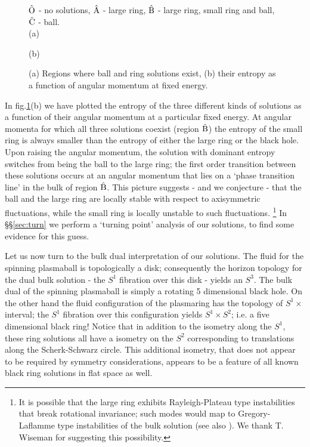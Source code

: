 \begin{figure}
%
 \begin{center}
  \small{$\hat{\mathrm{O}}$ - no solutions, $\hat{\mathrm{A}}$ - large ring, $\hat{\mathrm{B}}$ - large ring, small ring
  and ball, $\hat{\mathrm{C}}$ - ball.}\\
   \small{(a)}%
   
   \hspace{2.5cm}
   \small{(b)}%
   
 \caption{(a) Regions where ball and ring solutions
exist, (b) their entropy as a function of angular momentum at fixed
energy.}\label{exist_intro:fig}
 \end{center}
\end{figure}

In fig.\ref{exist_intro:fig}(b) we have plotted the entropy of the
three different kinds of solutions as a function of their angular
momentum at a particular fixed energy. At angular momenta for which
all three solutions coexist (region $\hat{\mathrm{B}}$) the entropy of the small
ring is always smaller than the entropy of either the large ring or
the black hole. Upon raising the angular momentum, the solution with
dominant entropy switches from being the ball to the large ring; the
first order transition between these solutions occurs at an angular
momentum that lies on a `phase transition line' in the bulk of
region $\hat{\mathrm{B}}$. This picture suggests - and we conjecture - that the
ball and the large ring are locally stable with respect to
axisymmetric fluctuations, while the small ring is locally unstable
to such fluctuations. \footnote{It is possible that the large ring
exhibits Rayleigh-Plateau type instabilities that break rotational
invariance; such modes would map to Gregory-Laflamme type
instabilities of the bulk solution (see also \cite{Cardoso:2006ks}).
We thank T. Wiseman for suggesting this possibility.} In
\S\S\ref{sec:turn} we perform a `turning point' analysis of our
solutions, to find some evidence for this guess.

Let us now turn to the bulk dual interpretation of our solutions.
The fluid for the spinning  plasmaball is topologically a disk;
consequently the horizon topology for the dual bulk solution - the
$S^1$ fibration over this disk - yields an $S^3$. The bulk dual of
the spinning plasmaball is simply a rotating 5 dimensional black
hole. On the other hand the fluid configuration of the plasmaring
has the topology of $S^1\times$ interval; the $S^1$ fibration over
this configuration yields $S^1 \times S^2$; i.e. a five dimensional
black ring! Notice that in addition to the isometry along the $S^1$, 
these ring solutions all have a isometry on the $S^2$ corresponding to translations 
along the Scherk-Schwarz circle. This additional isometry, that does not appear 
to be required by symmetry considerations, appears to be a feature of all known black ring solutions in flat space as well.

